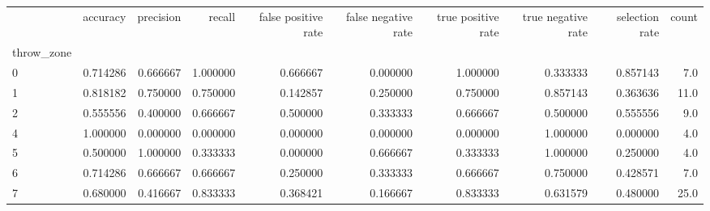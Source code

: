 \begin{tabular}{lrrrrrrrrr}
\toprule
{} &  accuracy &  precision &    recall &  false positive rate &  false negative rate &  true positive rate &  true negative rate &  selection rate &  count \\
throw\_zone &           &            &           &                      &                      &                     &                     &                 &        \\
\midrule
0          &  0.714286 &   0.666667 &  1.000000 &             0.666667 &             0.000000 &            1.000000 &            0.333333 &        0.857143 &    7.0 \\
1          &  0.818182 &   0.750000 &  0.750000 &             0.142857 &             0.250000 &            0.750000 &            0.857143 &        0.363636 &   11.0 \\
2          &  0.555556 &   0.400000 &  0.666667 &             0.500000 &             0.333333 &            0.666667 &            0.500000 &        0.555556 &    9.0 \\
4          &  1.000000 &   0.000000 &  0.000000 &             0.000000 &             0.000000 &            0.000000 &            1.000000 &        0.000000 &    4.0 \\
5          &  0.500000 &   1.000000 &  0.333333 &             0.000000 &             0.666667 &            0.333333 &            1.000000 &        0.250000 &    4.0 \\
6          &  0.714286 &   0.666667 &  0.666667 &             0.250000 &             0.333333 &            0.666667 &            0.750000 &        0.428571 &    7.0 \\
7          &  0.680000 &   0.416667 &  0.833333 &             0.368421 &             0.166667 &            0.833333 &            0.631579 &        0.480000 &   25.0 \\
\bottomrule
\end{tabular}
